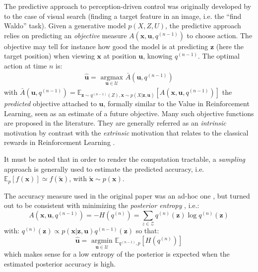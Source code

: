 \documentclass{article}
\begin{document}
The predictive approach to perception-driven control was originally developed by \cite{najemnik2005optimal} to the case of visual search (finding a target feature in an image, i.e. the ``find Waldo'' task).
Given a generative model $p(X,Z,U)$,  the predictive approach relies on predicting an \emph{objective} measure $A(\boldsymbol{x}, \boldsymbol{u}, q^{(n-1)})$ to choose action. 
The objective may tell for instance how good the model is at predicting $\boldsymbol{z}$ (here the target position) when viewing $\boldsymbol{x}$ at position $\boldsymbol{u}$,
knowing $q^{(n-1)}$.
The optimal action at time $n$ is:
\begin{align*}
\hat{\boldsymbol{u}} = \underset{\boldsymbol{u} \in \mathcal{U}}{\text{ argmax }} \bar{A}(\boldsymbol{u}, q^{(n-1)})
\end{align*}
with $\bar{A}(\boldsymbol{u}, q^{(n-1)})
= \mathbb{E}_{\boldsymbol{z} \sim q^{(n-1)}(Z), \boldsymbol{x} \sim p(X|\boldsymbol{z}, \boldsymbol{u})}\left[A(\boldsymbol{x}, \boldsymbol{u}, q^{(n-1)})\right]$ the \emph{predicted} objective attached to $\boldsymbol{u}$, 
formally similar to the Value in Reinforcement Learning, seen as an estimate of a future objective.
Many such objective functions are proposed in the literature. They are generally referred as an \emph{intrinsic} motivation \cite{oudeyer2008can} by contrast with the \emph{extrinsic} motivation that relates to the classical rewards in Reinforcement Learning \cite{sutton1998reinforcement}.


It must be noted that in order to render the computation tractable, a \emph{sampling} approach is generally used to estimate the predicted accuracy, i.e. $\mathbb{E}_p[f(\boldsymbol{x})] \simeq f(\tilde{\boldsymbol{x}})$, with $\tilde{\boldsymbol{x}}\sim p(\boldsymbol{x})$.

The accuracy measure used in the original paper was an ad-hoc one \cite{najemnik2005optimal}, but turned out to be consistent with minimizing the \emph{posterior entropy} \cite{najemnik2009simple}, i.e.:
$$A(\boldsymbol{x}, \boldsymbol{u}, q^{(n-1)}) = -H(q^{(n)}) = \sum_{z \in \mathcal{Z}} q^{(n)}(\boldsymbol{z}) \log q^{(n)}(\boldsymbol{z})$$
with: $q^{(n)}(\boldsymbol{z}) \propto p(\boldsymbol{x|\boldsymbol{z}, \boldsymbol{u}})q^{(n-1)}(\boldsymbol{z}) $
so that:
$$\hat{\boldsymbol{u}} = \underset{\boldsymbol{u} \in \mathcal{U}}{\text{ argmin }} \mathbb{E}_{q^{(n-1)},p}\left[H(q^{(n)})\right] $$ 
which makes sense for a low entropy of the posterior is expected when the estimated posterior accuracy is high.
\end{document}
